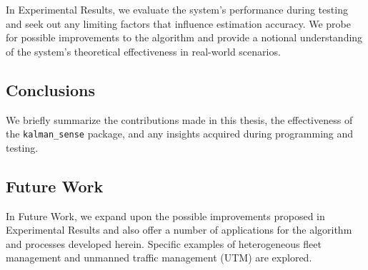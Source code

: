 In Experimental Results, we evaluate the system's performance during testing and seek out any limiting factors that influence estimation accuracy. We probe for possible improvements to the algorithm and provide a notional understanding of the system's theoretical effectiveness in real-world scenarios.

\subsection*{Conclusions}

We briefly summarize the contributions made in this thesis, the effectiveness of the \texttt{kalman\_sense} package, and any insights acquired during programming and testing. 

\subsection*{Future Work}

In Future Work, we expand upon the possible improvements proposed in Experimental Results and also offer a number of applications for the algorithm and processes developed herein. Specific examples of heterogeneous fleet management and unmanned traffic management (UTM) are explored.